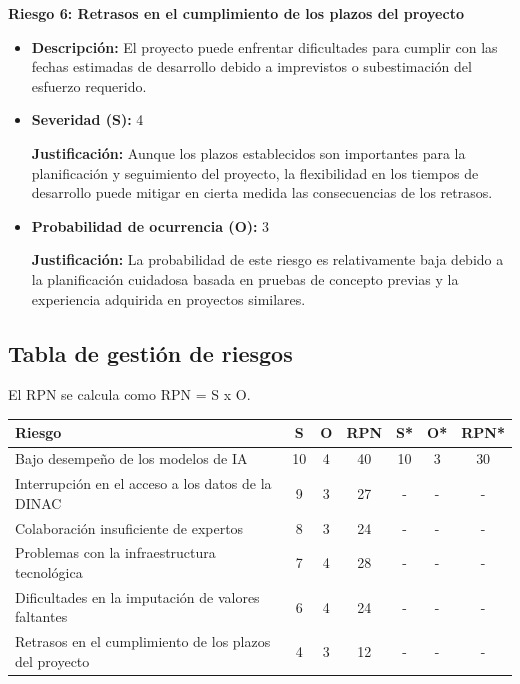 \documentclass[
11pt, %
codirector, %
]{charter}
\begin{document}
\textbf{Riesgo 6: Retrasos en el cumplimiento de los plazos del proyecto}

\begin{itemize}
  \item \textbf{Descripción:} El proyecto puede enfrentar dificultades para cumplir con las fechas estimadas de desarrollo debido a imprevistos o subestimación del esfuerzo requerido.
  \item \textbf{Severidad (S):} 4
  
  \textbf{Justificación:} Aunque los plazos establecidos son importantes para la planificación y seguimiento del proyecto, la flexibilidad en los tiempos de desarrollo puede mitigar en cierta medida las consecuencias de los retrasos.
  \item \textbf{Probabilidad de ocurrencia (O):} 3
  
  \textbf{Justificación:} La probabilidad de este riesgo es relativamente baja debido a la planificación cuidadosa basada en pruebas de concepto previas y la experiencia adquirida en proyectos similares.
\end{itemize}

\subsection{Tabla de gestión de riesgos}

El RPN se calcula como RPN = S x O.

\begin{table}[htpb]
\centering
\begin{tabularx}{\linewidth}{@{}|X|c|c|c|c|c|c|@{}}
\hline
\rowcolor[HTML]{C0C0C0} 
Riesgo & S & O & RPN & S* & O* & RPN* \\ \hline
Bajo desempeño de los modelos de IA & 10 & 4 & 40 & 10 & 3 & 30 \\ \hline
Interrupción en el acceso a los datos de la DINAC & 9 & 3 & 27 & - & - & - \\ \hline
Colaboración insuficiente de expertos & 8 & 3 & 24 & - & - & - \\ \hline
Problemas con la infraestructura tecnológica & 7 & 4 & 28 & - & - & - \\ \hline
Dificultades en la imputación de valores faltantes & 6 & 4 & 24 & - & - & - \\ \hline
Retrasos en el cumplimiento de los plazos del proyecto & 4 & 3 & 12 & - & - & - \\ \hline
\end{tabularx}%
\end{table}
\end{document}
